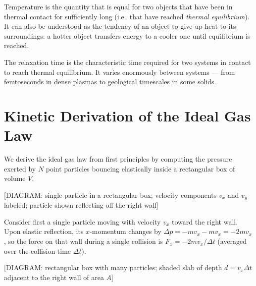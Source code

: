 \begin{definition}[Temperature]
Temperature is the quantity that is equal for two objects that have been in thermal contact for sufficiently long (i.e.\ that have reached \emph{thermal equilibrium}). It can also be understood as the tendency of an object to give up heat to its surroundings: a hotter object transfers energy to a cooler one until equilibrium is reached.
\end{definition}

\begin{definition}
The relaxation time is the characteristic time required for two systems in contact to reach thermal equilibrium. It varies enormously between systems — from femtoseconds in dense plasmas to geological timescales in some solids.
\end{definition}

\section{Kinetic Derivation of the Ideal Gas Law}

We derive the ideal gas law from first principles by computing the pressure exerted by $N$ point particles bouncing elastically inside a rectangular box of volume $V$.

\begin{center}[DIAGRAM: single particle in a rectangular box; velocity components $v_x$ and $v_y$ labeled; particle shown reflecting off the right wall]\end{center}

Consider first a single particle moving with velocity $v_x$ toward the right wall. Upon elastic reflection, its $x$-momentum changes by $\Delta p = -mv_x - mv_x = -2mv_x$, so the force on that wall during a single collision is $F_x = -2mv_x/\Delta t$ (averaged over the collision time $\Delta t$).

\begin{center}[DIAGRAM: rectangular box with many particles; shaded slab of depth $d = v_x\Delta t$ adjacent to the right wall of area $A$]\end{center}

